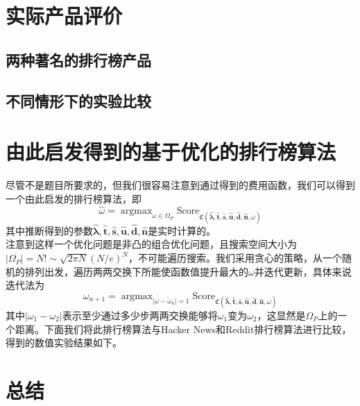 \documentclass[UTF8]{ctexart}
\theoremstyle{plain}
\theoremstyle{definition}
\theoremstyle{remark}
\DeclareMathOperator*{\argmax}{argmax}
\begin{document}
	\section{实际产品评价}
	\subsection{两种著名的排行榜产品}
	\subsection{不同情形下的实验比较}
	\section{由此启发得到的基于优化的排行榜算法}
	尽管不是题目所要求的，但我们很容易注意到通过得到的费用函数，我们可以得到一个由此启发的排行榜算法，即
	\begin{equation}
	\hat{\omega} = \argmax_{\omega \in \Omega_P} \mathrm{Score}_{\mathfrak{C}\left(\bm{\hat{\lambda}}, \bm{\hat{t}}, \bm{\hat{s}}, \bm{\hat{u}}, \bm{\hat{d}}, \bm{\hat{n}},\omega\right)}
	\end{equation}
	其中推断得到的参数$\bm{\hat{\lambda}}, \bm{\hat{t}}, \bm{\hat{s}}, \bm{\hat{u}}, \bm{\hat{d}}, \bm{\hat{n}}$是实时计算的。 \\
	
	注意到这样一个优化问题是非凸的组合优化问题，且搜索空间大小为$|\Omega_P| = N! \sim \sqrt{2\pi N} \left(N/e\right)^N$，不可能遍历搜索。我们采用贪心的策略，从一个随机的排列出发，遍历两两交换下所能使函数值提升最大的$\omega$并迭代更新，具体来说迭代法为
	$$
	\omega_{n+1} =  \argmax_{|\omega - \omega_n| = 1} \mathrm{Score}_{\mathfrak{C}\left(\bm{\hat{\lambda}}, \bm{\hat{t}}, \bm{\hat{s}}, \bm{\hat{u}}, \bm{\hat{d}}, \bm{\hat{n}},\omega\right)}
	$$
	其中$|\omega_1 -\omega_2|$表示至少通过多少步两两交换能够将$\omega_1$变为$\omega_2$，这显然是$\Omega_P$上的一个距离。下面我们将此排行榜算法与Hacker News和Reddit排行榜算法进行比较，得到的数值实验结果如下。
	\section{总结}
	
	
	\newpage
	\appendix
\end{document}
